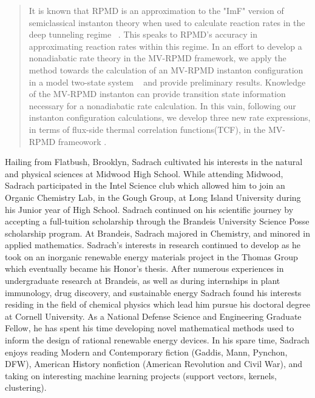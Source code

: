 \documentclass[phd,tocprelim]{cornell}
\begin{document}
\begin{abstract}
It is known that RPMD is an approximation to the "ImF" version of semiclassical instanton theory when used to calculate reaction rates in the deep tunneling regime ~\cite{SCA2009}. This speaks to RPMD's accuracy in approximating reaction rates within this regime. In an effort to develop a nonadiabatic rate theory in the MV-RPMD framework, we apply the method towards the calculation of an MV-RPMD instanton configuration in a model two-state system ~\cite{CAO1995} and provide preliminary results. Knowledge of the MV-RPMD instanton can provide transition state information necessary for a nonadiabatic rate calculation. In this vain, following our instanton configuration calculations, we develop three new rate expressions, in terms of flux-side thermal correlation functions(TCF), in the MV-RPMD frameowork . 






\end{abstract}


\begin{biosketch}

Hailing from Flatbush, Brooklyn, Sadrach cultivated his interests in the natural and physical sciences at Midwood High School. While attending Midwood, Sadrach participated in the Intel Science club which allowed him to join an Organic Chemistry Lab, in the Gough Group, at Long Island University during his Junior year of High School. Sadrach continued on his scientific journey by accepting a full-tuition scholarship through the Brandeis University Science Posse scholarship program. At Brandeis, Sadrach majored in Chemistry, and minored in applied mathematics. Sadrach's interests in research continued to develop as he took on an inorganic renewable energy materials project in the Thomas Group which eventually became his Honor's thesis. After numerous experiences in undergraduate research at Brandeis, as well as during internships in plant immunology, drug discovery, and sustainable energy Sadrach found his interests residing in the field of chemical physics which lead him pursue his doctoral degree at Cornell University. As a National Defense Science and Engineering Graduate Fellow, he has spent his time developing novel mathematical methods used to inform the design of rational renewable energy devices. In his spare time, Sadrach enjoys reading Modern and Contemporary fiction (Gaddis, Mann, Pynchon, DFW), American History nonfiction (American Revolution and Civil War), and taking on interesting machine learning projects (support vectors, kernels, clustering). 

\end{biosketch}
\end{document}
